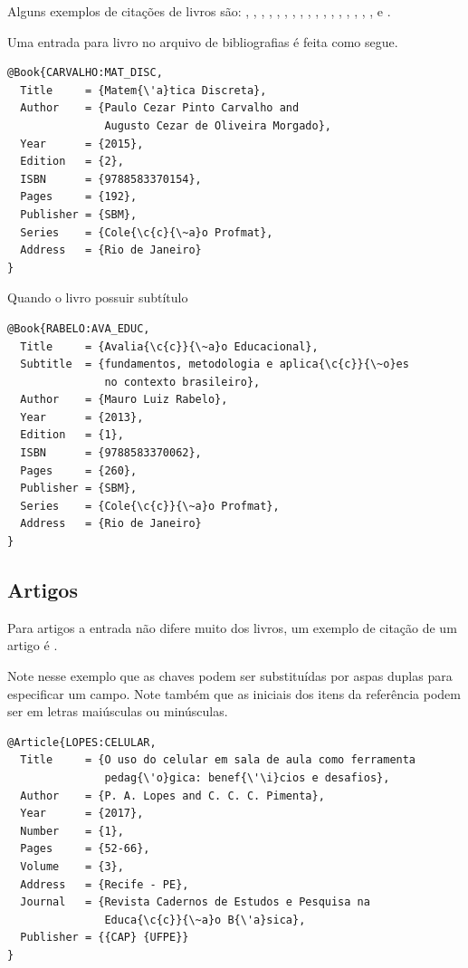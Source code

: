 \documentclass[fleqn]{icat-ufal}
\begin{document}
Alguns exemplos de citações de livros são:
\citeauthor{MOREIRA:TOP_TEO_NUM}, 
\citeauthor{CARVALHO:MAT_DISC}, 
\citeauthor{GIRALDO:REC_COMP_ENS_MAT}, 
\citeauthor{GOMEZ:GEO_ANA}, 
\citeauthor{HEFEZ:ARIT}, 
\citeauthor{HEFEZ:EX_RES_ARIT}, 
\citeauthor{HEFEZ:EX_RES_ALG_LIN}, 
\citeauthor{HEFEZ:INTRO_ALG_LIN}, 
\citeauthor{HEFEZ:POLY_EQ_ALG}, 
\citeauthor{LAMPORT:LATEX}, 
\citeauthor{LIMA:NUM_FUNC_R}, 
\citeauthor{MORAISFILHO:MAN_REDACAO_MAT}, 
\citeauthor{MUNIZNETO:FUND_CALC}, 
\citeauthor{MUNIZNETO:GEO}, 
\citeauthor{PITOMBEIRA:TOP_HIST_MAT}, 
\citeauthor{RABELO:AVA_EDUC}, 
\citeauthor{ROUSSEAU:MAT_ATU_1}, 
\citeauthor{ROUSSEAU:MAT_ATU_2} e 
\citeauthor{WAGNER:T_PROB_ELEM}.

Uma entrada para livro no arquivo de bibliografias é feita como segue.
\begin{lstlisting}
@Book{CARVALHO:MAT_DISC,
  Title     = {Matem{\'a}tica Discreta},
  Author    = {Paulo Cezar Pinto Carvalho and 
               Augusto Cezar de Oliveira Morgado},
  Year      = {2015},
  Edition   = {2},
  ISBN      = {9788583370154},
  Pages     = {192},
  Publisher = {SBM},
  Series    = {Cole{\c{c}{\~a}o Profmat},
  Address   = {Rio de Janeiro}
}
\end{lstlisting}

Quando o livro possuir subtítulo
\begin{lstlisting}
@Book{RABELO:AVA_EDUC,
  Title     = {Avalia{\c{c}}{\~a}o Educacional},
  Subtitle  = {fundamentos, metodologia e aplica{\c{c}}{\~o}es 
               no contexto brasileiro},
  Author    = {Mauro Luiz Rabelo},
  Year      = {2013},
  Edition   = {1},
  ISBN      = {9788583370062},
  Pages     = {260},
  Publisher = {SBM},
  Series    = {Cole{\c{c}}{\~a}o Profmat},
  Address   = {Rio de Janeiro}
}
\end{lstlisting}

\subsection{Artigos}

Para artigos a entrada não difere muito dos livros, 
um exemplo de citação de um artigo é \citeauthor{LOPES:CELULAR}.

Note nesse exemplo que as chaves podem ser substituídas por aspas duplas para especificar um campo. 
Note também que as iniciais dos itens da referência podem ser em letras maiúsculas ou minúsculas.
\begin{lstlisting}
@Article{LOPES:CELULAR,
  Title     = {O uso do celular em sala de aula como ferramenta 
               pedag{\'o}gica: benef{\'\i}cios e desafios},
  Author    = {P. A. Lopes and C. C. C. Pimenta},
  Year      = {2017},
  Number    = {1},
  Pages     = {52-66},
  Volume    = {3},
  Address   = {Recife - PE},
  Journal   = {Revista Cadernos de Estudos e Pesquisa na 
               Educa{\c{c}}{\~a}o B{\'a}sica},
  Publisher = {{CAP} {UFPE}}
}
\end{lstlisting}
\end{document}
